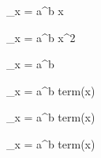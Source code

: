 \sum_{x = a}^b x

\sum_{x = a}^b x^2

\sum_{x = a}^b 

\sum_{x = a}^b term(x)

\prod_{x = a}^b term(x)

\bigwedge_{x = a}^b term(x)

\cdots
